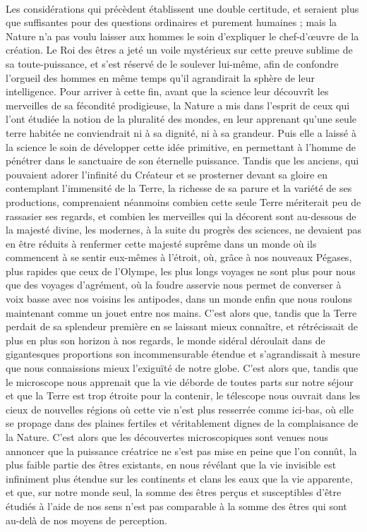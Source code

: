 \documentclass[a4paper, 11pt, oneside]{article}
\begin{document}
\paragraph{}
Les considérations qui précèdent établissent une double certitude, et seraient plus que suffisantes pour des questions ordinaires et purement humaines ; mais la Nature n'a pas voulu laisser aux hommes le soin d'expliquer le chef-d'œuvre de la création. Le Roi des êtres a jeté un voile mystérieux sur cette preuve sublime de sa toute-puissance, et s'est réservé de le soulever lui-même, afin de confondre l'orgueil des hommes en même temps qu'il agrandirait la sphère de leur intelligence. Pour arriver à cette fin, avant que la science leur découvrît les merveilles de sa fécondité prodigieuse, la Nature a mis dans l'esprit de ceux qui l'ont étudiée la notion de la pluralité des mondes, en leur apprenant qu'une seule terre habitée ne conviendrait ni à sa dignité, ni à sa grandeur. Puis elle a laissé à la science le soin de développer cette idée primitive, en permettant à l'homme de pénétrer dans le sanctuaire de son éternelle puissance. Tandis que les anciens, qui pouvaient adorer l'infinité du Créateur et se prosterner devant sa gloire en contemplant l'immensité de la Terre, la richesse de sa parure et la variété de ses productions, comprenaient néanmoins combien cette seule Terre mériterait peu de rassasier ses regards, et combien les merveilles qui la décorent sont au-dessous de la majesté divine, les modernes, à la suite du progrès des sciences, ne devaient pas en être réduits à renfermer cette majesté suprême dans un monde où ils commencent à se sentir eux-mêmes à l'étroit, où, grâce à nos nouveaux Pégases, plus rapides que ceux de l'Olympe, les plus longs voyages ne sont plus pour nous que des voyages d'agrément, où la foudre asservie nous permet de converser à voix basse avec nos voisins les antipodes, dans un monde enfin que nous roulons maintenant comme un jouet entre nos mains. C'est alors que, tandis que la Terre perdait de sa splendeur première en se laissant mieux connaître, et rétrécissait de plus en plus son horizon à nos regards, le monde sidéral déroulait dans de gigantesques proportions son incommensurable étendue et s'agrandissait à mesure que nous connaissions mieux l'exiguïté de notre globe. C'est alors que, tandis que le microscope nous apprenait que la vie déborde de toutes parts sur notre séjour et que la Terre est trop étroite pour la contenir, le télescope nous ouvrait dans les cieux de nouvelles régions où cette vie n'est plus resserrée comme ici-bas, où elle se propage dans des plaines fertiles et véritablement dignes de la complaisance de la Nature. C'est alors que les découvertes microscopiques sont venues nous annoncer que la puissance créatrice ne s'est pas mise en peine que l'on connût, la plus faible partie des êtres existants, en nous révélant que la vie invisible est infiniment plus étendue sur les continents et clans les eaux que la vie apparente, et que, sur notre monde seul, la somme des êtres perçus et susceptibles d'être étudiés à l'aide de nos sens n'est pas comparable à la somme des êtres qui sont au-delà de nos moyens de perception.
\end{document}
